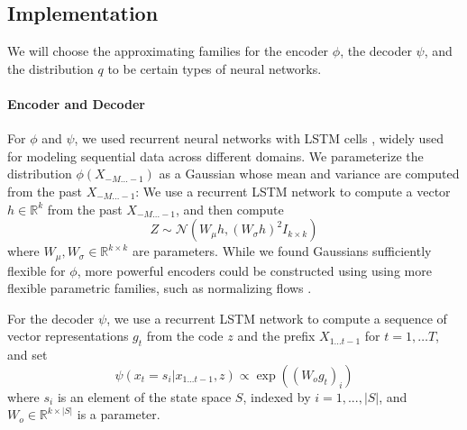 \documentclass[11pt,letterpaper]{article}
\begin{document}


\subsection{Implementation}
We will choose the approximating families for the encoder $\phi$, the decoder $\psi$, and the distribution $q$ to be certain types of neural networks.
\paragraph{Encoder and Decoder}
For $\phi$ and $\psi$, we used recurrent neural networks with LSTM cells \citep{hochreiter-long-1997}, widely used for modeling sequential data across different domains.
We parameterize the distribution $\phi(X_{-M\dots-1})$ as a Gaussian whose mean and variance are computed from the past $X_{-M\dots-1}$:
We use a recurrent LSTM network to compute a vector $h \in \mathbb{R}^k$ from the past $X_{-M\dots-1}$, and then compute
\begin{equation}
	Z \sim \mathcal{N}(W_\mu h, (W_\sigma h)^2 I_{k\times k})
\end{equation}
where $W_\mu, W_\sigma \in \mathbb{R}^{k\times k}$ are parameters.
While we found Gaussians sufficiently flexible for $\phi$, more powerful encoders could be constructed using using more flexible parametric families, such as normalizing flows \citep{rezende-variational-2015, kingma-improving-2016}.

For the decoder $\psi$, we use a recurrent LSTM network to compute a sequence of vector representations $g_t$ from the code $z$ and the prefix $X_{1\dots t-1}$ for $t = 1, \dots T$, and set
\begin{equation}
	\psi(x_t = s_i|x_{1...t-1}, z) \propto \exp((W_o g_t)_i)
\end{equation}
where $s_i$ is an element of the state space $S$, indexed by $i=1, ..., |S|$, and $W_o \in \mathbb{R}^{k \times |S|}$ is a parameter.




%
\end{document}
